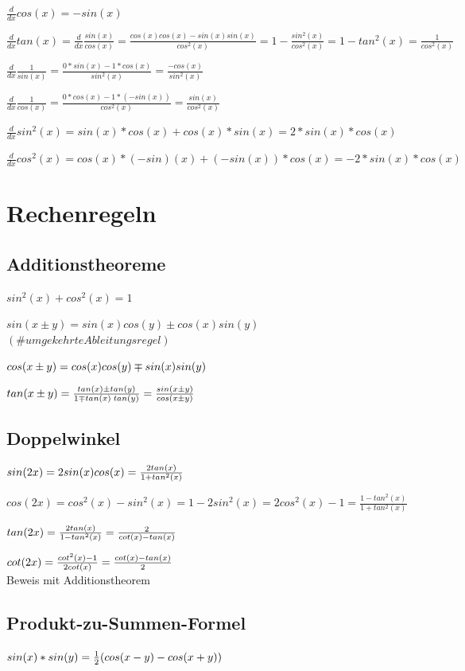 $\frac{d}{dx}cos(x) = -sin(x)$

$\frac{d}{dx}tan(x) = \frac{d}{dx} \frac{sin(x)}{cos(x)} = \frac{cos(x)cos(x)- sin(x)sin(x)}{cos^2(x)} = 1 - \frac{sin^2(x)}{cos^2(x)} = 1 - tan^2(x) = \frac{1}{cos^2(x)}$

$\frac{d}{dx} \frac{1}{sin(x)} = \frac{0*sin(x) - 1*cos(x)}{sin^2(x)} = \frac{-cos(x)}{sin^2(x)}$ 

$\frac{d}{dx} \frac{1}{cos(x)} = \frac{0*cos(x) - 1*(-sin(x))}{cos^2(x)} = \frac{sin(x)}{cos^2(x)}$

$\frac{d}{dx}sin^2(x) = sin(x)*cos(x)+ cos(x)*sin(x) = 2*sin(x)*cos(x)$

$\frac{d}{dx}cos^2(x) = cos(x)*(-sin)(x)+ (-sin(x))*cos(x) = -2*sin(x)*cos(x)$ 

\section{Rechenregeln}
\subsection{Additionstheoreme}
$sin^2(x)+cos^2(x) = 1$

$sin(x \pm y) = sin(x)cos(y) \pm cos(x)sin(y)$    \ \ $(\# umgekehrteAbleitungsregel)$

$cos(x \pm y) = cos(x)cos(y) \mp sin(x) sin(y)$

$tan(x \pm y) = \frac{tan(x) \pm tan(y)}{ 1 \mp tan(x) \; tan(y) } = \frac{ sin(x \pm y) }{cos(x \pm y) }$

\subsection{Doppelwinkel}
$sin(2x)= 2sin(x) cos(x) = \frac{2 tan(x)}{ 1 + tan^2(x) }$

$cos(2x)= cos^2(x) - sin^2(x) = 1 - 2sin^2(x) = 2cos^2(x) - 1 = \frac{ 1 - tan^2(x) }{ 1 + tan^2(x) }$

$tan(2x)= \frac{ 2 tan(x) }{ 1 - tan^2(x) } = \frac{2}{ cot(x) - tan(x) }$

$cot(2x)= \frac{ cot^2(x) - 1}{2cot(x)} = \frac{cot(x) - tan(x)}{2}$ \\

Beweis mit Additionstheorem



\subsection{Produkt-zu-Summen-Formel}
$sin(x)*sin(y) = \frac{1}{2}(cos(x-y)-cos(x+y))$

